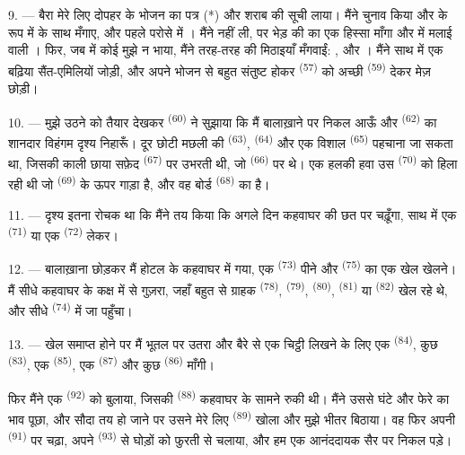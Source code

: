 9. --- बैरा मेरे लिए दोपहर के भोजन का पत्र (*) और शराब की सूची लाया। मैंने चुनाव
किया और  के रूप में  के साथ 
मँगाए, और पहले परोसे में । मैंने  नहीं
ली, पर भेड़ की  का एक हिस्सा माँगा और  में मलाई वाली
। फिर, जब  में कोई मुझे न भाया, मैंने
तरह-तरह की मिठाइयाँ मँगवाईं: ,  और ।
मैंने साथ में एक बढ़िया सैंत-एमिलियों  जोड़ी, और अपने भोजन से बहुत
संतुष्ट होकर  \textsuperscript{(57)} को अच्छी 
\textsuperscript{(59)} देकर मेज़ छोड़ी।

10. --- मुझे उठने को तैयार देखकर  \textsuperscript{(60)} ने सुझाया
कि मैं बालाख़ाने पर निकल आऊँ और  \textsuperscript{(62)} का शानदार
विहंगम दृश्य निहारूँ। दूर छोटी मछली की  \textsuperscript{(63)},
 \textsuperscript{(64)} और एक विशाल 
\textsuperscript{(65)} पहचाना जा सकता था, जिसकी काली छाया सफ़ेद 
\textsuperscript{(67)} पर उभरती थी, जो  \textsuperscript{(66)} पर
थे।
एक हलकी हवा उस  \textsuperscript{(70)} को हिला रही थी जो
 \textsuperscript{(69)} के ऊपर गाड़ा है, और वह बोर्ड
 \textsuperscript{(68)} का है।

\VUsaut{3.0mm}
\VUsaut{3.0mm}

11. --- दृश्य इतना रोचक था कि मैंने तय किया कि अगले दिन कहवाघर की छत पर चढ़ूँगा,
साथ में एक  \textsuperscript{(71)} या एक 
\textsuperscript{(72)} लेकर।

12. --- बालाख़ाना छोड़कर मैं होटल के कहवाघर में गया, एक 
\textsuperscript{(73)} पीने और  \textsuperscript{(75)} का एक खेल
खेलने। मैं सीधे कहवाघर के कक्ष में से गुज़रा, जहाँ बहुत से ग्राहक
 \textsuperscript{(78)},  \textsuperscript{(79)},
 \textsuperscript{(80)},  \textsuperscript{(81)} या
 \textsuperscript{(82)} खेल रहे थे, और सीधे
 \textsuperscript{(74)} में जा पहुँचा।

13. --- खेल समाप्त होने पर मैं भूतल पर उतरा और बैरे से एक चिट्ठी लिखने के लिए
एक  \textsuperscript{(84)}, कुछ 
\textsuperscript{(83)}, एक  \textsuperscript{(85)}, एक
 \textsuperscript{(87)} और कुछ  \textsuperscript{(86)}
माँगी।

फिर मैंने एक  \textsuperscript{(92)} को बुलाया, जिसकी
 \textsuperscript{(88)} कहवाघर के सामने रुकी थी। मैंने उससे घंटे और
फेरे का भाव पूछा, और सौदा तय हो जाने पर उसने मेरे लिए 
\textsuperscript{(89)} खोला और मुझे भीतर बिठाया। वह फिर अपनी 
\textsuperscript{(91)} पर चढ़ा, अपने  \textsuperscript{(93)} से घोड़ों
को फुरती से चलाया, और हम एक आनंददायक सैर पर निकल पड़े।
\VUsaut{6.0mm}
\VUfilet{22mm}

